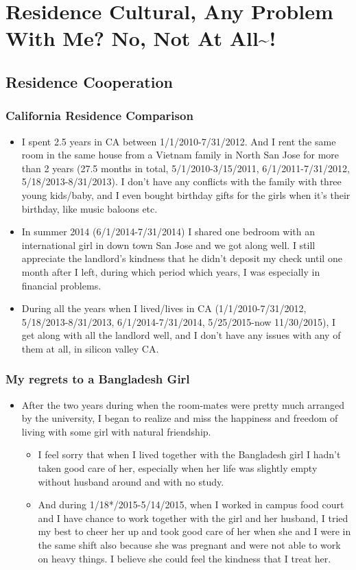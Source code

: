 \documentclass[9pt,b5paper]{article}
\begin{document}
\section{Residence Cultural, Any Problem With Me? No, Not At All\textasciitilde{}!}
\label{sec-3}
\subsection{Residence Cooperation}
\label{sec-3-1}
\subsubsection{California Residence Comparison}
\label{sec-3-1-1}
\begin{itemize}
\item I spent 2.5 years in CA between 1/1/2010-7/31/2012. And I rent the same room in the same house from a Vietnam family in North San Jose for more than 2 years (27.5 months in total, 5/1/2010-3/15/2011, 6/1/2011-7/31/2012, 5/18/2013-8/31/2013). I don't have any conflicts with the family with three young kids/baby, and I even bought birthday gifts for the girls when it's their birthday, like music baloons etc.
\item In summer 2014 (6/1/2014-7/31/2014) I shared one bedroom with an international girl in down town San Jose and we got along well. I still appreciate the landlord's kindness that he didn't deposit my check until one month after I left, during which period which years, I was especially in financial problems.
\item During all the years when I lived/lives in CA (1/1/2010-7/31/2012, 5/18/2013-8/31/2013, 6/1/2014-7/31/2014, 5/25/2015-now 11/30/2015), I get along with all the landlord well, and I don't have any issues with any of them at all, in silicon valley CA.
\end{itemize}
\subsubsection{My regrets to a Bangladesh Girl}
\label{sec-3-1-2}
\begin{itemize}
\item After the two years during when the room-mates were pretty much arranged by the university, I began to realize and miss the happiness and freedom of living with some girl with natural friendship. 
\begin{itemize}
\item I feel sorry that when I lived together with the Bangladesh girl I hadn't taken good care of her, especially when her life was slightly empty without husband around and with no study.
\item And during 1/18*/2015-5/14/2015, when I worked in campus food court and I have chance to work together with the girl and her husband, I tried my best to cheer her up and took good care of her when she and I were in the same shift also because she was pregnant and were not able to work on heavy things. I believe she could feel the kindness that I treat her.
\end{itemize}
\end{itemize}
\end{document}
